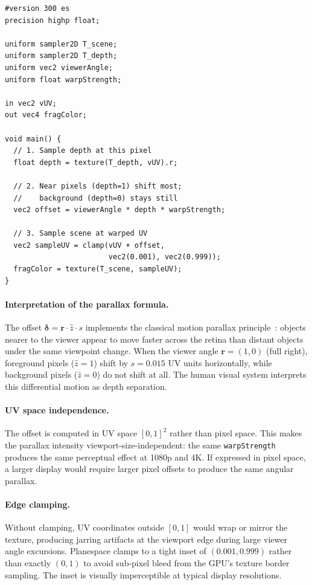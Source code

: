 \documentclass[10pt,twocolumn]{article}
\newcommand{\normz}{\hat{z}}
\newcommand{\offset}{\boldsymbol{\delta}}
\begin{document}
\begin{lstlisting}[style=glsl,caption={Core parallax warp in fragment shader.}]
#version 300 es
precision highp float;

uniform sampler2D T_scene;
uniform sampler2D T_depth;
uniform vec2 viewerAngle;
uniform float warpStrength;

in vec2 vUV;
out vec4 fragColor;

void main() {
  // 1. Sample depth at this pixel
  float depth = texture(T_depth, vUV).r;

  // 2. Near pixels (depth=1) shift most;
  //    background (depth=0) stays still
  vec2 offset = viewerAngle * depth * warpStrength;

  // 3. Sample scene at warped UV
  vec2 sampleUV = clamp(vUV + offset,
                        vec2(0.001), vec2(0.999));
  fragColor = texture(T_scene, sampleUV);
}
\end{lstlisting}

\paragraph{Interpretation of the parallax formula.}
The offset $\offset = \mathbf{r} \cdot \normz \cdot s$ implements the
classical motion parallax principle~\cite{gibson1950}: objects nearer to the
viewer appear to move faster across the retina than distant objects under
the same viewpoint change. When the viewer angle $\mathbf{r} = (1, 0)$ (full
right), foreground pixels ($\normz = 1$) shift by $s = 0.015$ UV units
horizontally, while background pixels ($\normz = 0$) do not shift at all.
The human visual system interprets this differential motion as depth separation.

\paragraph{UV space independence.}
The offset is computed in UV space $[0,1]^2$ rather than pixel space.
This makes the parallax intensity viewport-size-independent: the same
\texttt{warpStrength} produces the same perceptual effect at 1080p and 4K.
If expressed in pixel space, a larger display would require larger pixel
offsets to produce the same angular parallax.

\paragraph{Edge clamping.}
Without clamping, UV coordinates outside $[0,1]$ would wrap or
mirror the texture, producing jarring artifacts at the viewport edge during
large viewer angle excursions. Planespace clamps to a tight inset of
$(0.001, 0.999)$ rather than exactly $(0, 1)$ to avoid sub-pixel bleed
from the GPU's texture border sampling. The inset is visually
imperceptible at typical display resolutions.
\end{document}
